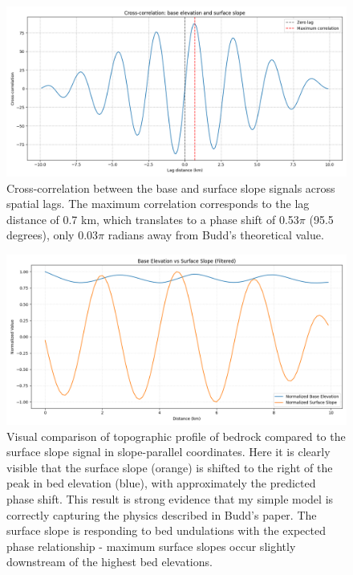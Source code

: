 \begin{figure}
    \includegraphics[scale=0.5]{xcorr.png}
    \caption{Cross-correlation between the base and surface slope signals across spatial lags. The maximum correlation corresponds to the lag distance of 0.7 km, which translates to a phase shift of 0.53$\pi$ (95.5 degrees), only 0.03$\pi$ radians away from Budd's theoretical value.}
    \label{fig:xcorr_filtered}
\end{figure}

\begin{figure}
    \includegraphics[scale=0.5]{direct.png}
    \caption{Visual comparison of topographic profile of bedrock compared to the surface slope signal in slope-parallel coordinates. Here it is clearly visible that the surface slope (orange) is shifted to the right of the peak in bed elevation (blue), with approximately the predicted phase shift. This result is strong evidence that my simple model is correctly capturing the physics described in Budd's paper. The surface slope is responding to bed undulations with the expected phase relationship - maximum surface slopes occur slightly downstream of the highest bed elevations.}
    \label{fig:direct}
\end{figure}












